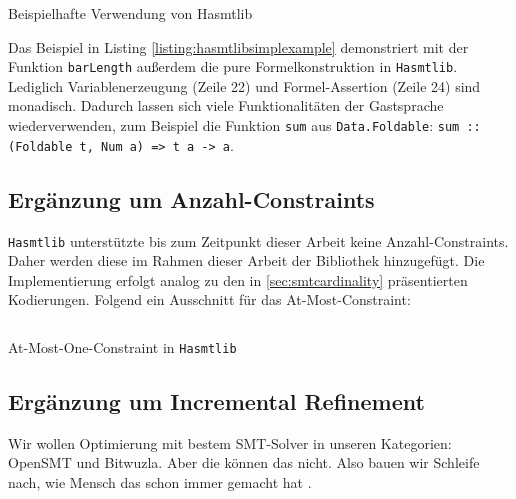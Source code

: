 \begin{listing}[H]
    \inputminted[linenos=true]{haskell}{Code/Implementierung/Hasmtlib/BeispielSimple.hs}
    \caption{Beispielhafte Verwendung von Hasmtlib}
    \label{listing:hasmtlibsimplexample}
\end{listing}

Das Beispiel in Listing \ref{listing:hasmtlibsimplexample} demonstriert mit der Funktion \texttt{barLength} außerdem die pure Formelkonstruktion in \texttt{Hasmtlib}.
Lediglich Variablenerzeugung (Zeile 22) und Formel-Assertion (Zeile 24) sind monadisch.
Dadurch lassen sich viele Funktionalitäten der Gastsprache wiederverwenden, zum Beispiel die Funktion \texttt{sum} aus \texttt{Data.Foldable}:
\texttt{sum :: (Foldable t, Num a) => t a -> a}.

\subsection{Ergänzung um Anzahl-Constraints}
\label{subsec:implCardinality}
\texttt{Hasmtlib} unterstützte bis zum Zeitpunkt dieser Arbeit keine Anzahl-Constraints.
Daher werden diese im Rahmen dieser Arbeit der Bibliothek hinzugefügt.
Die Implementierung erfolgt analog zu den in \ref{sec:smtcardinality} präsentierten Kodierungen.
Folgend ein Ausschnitt für das At-Most-Constraint:

\begin{listing}[H]
    \inputminted[linenos=true]{haskell}{Code/Implementierung/Hasmtlib/Cardinality.hs}
    \caption{At-Most-One-Constraint in \texttt{Hasmtlib} \cite{hasmtlibCardinality}}
    \label{listing:hasmtlibcardinality}
\end{listing}

\subsection{Ergänzung um Incremental Refinement}
Wir wollen Optimierung mit bestem SMT-Solver in unseren Kategorien: OpenSMT und Bitwuzla.
Aber die können das nicht.
Also bauen wir Schleife nach, wie Mensch das schon immer gemacht hat \cite{nuz3}.